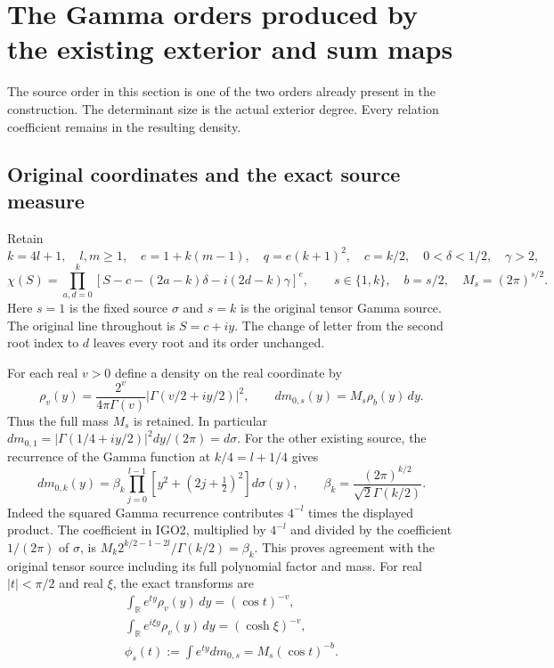 \documentclass[11pt,a4paper]{article}
\begin{document}

\clearpage

\section{The Gamma orders produced by the existing exterior and sum maps}
\label{sec:IGO}

The source order in this section is one of the two orders already present
in the construction. The determinant size is the actual exterior degree.
Every relation coefficient remains in the resulting density.

\subsection{Original coordinates and the exact source measure}
Retain
\[
 k=4l+1,\quad l,m\geq1,\quad e=1+k(m-1),\quad
 q=e(k+1)^2,\quad c=k/2,\quad
 0<\delta<1/2,\quad\gamma>2,
\]
\[
 \chi(S)=\prod_{a,d=0}^{k}
 [S-c-(2a-k)\delta-i(2d-k)\gamma]^e,
 \qquad s\in\{1,k\},\quad b=s/2,\quad M_s=(2\pi)^{s/2}.
 \tag{IGO1}
\]
Here $s=1$ is the fixed source $\sigma$ and $s=k$ is the original
tensor Gamma source. The original line throughout is $S=c+iy$.
The change of letter from the second root index to $d$ leaves every
root and its order unchanged.

For each real $v>0$ define a density on the real coordinate by
\[
 \rho_v(y)=\frac{2^v}{4\pi\Gamma(v)}
       \left|\Gamma(v/2+iy/2)\right|^2,
 \qquad dm_{0,s}(y)=M_s\rho_b(y)\,dy.
 \tag{IGO2}
\]
Thus the full mass $M_s$ is retained. In particular
$dm_{0,1}=|\Gamma(1/4+iy/2)|^2dy/(2\pi)=d\sigma$.
For the other existing source, the recurrence of the Gamma function
at $k/4=l+1/4$ gives
\[
 dm_{0,k}(y)=\beta_k\prod_{j=0}^{l-1}
           [y^2+(2j+\tfrac12)^2]d\sigma(y),\qquad
 \beta_k=\frac{(2\pi)^{k/2}}{\sqrt2\Gamma(k/2)}.
\]
Indeed the squared Gamma recurrence contributes $4^{-l}$ times
the displayed product. The coefficient in IGO2, multiplied by
$4^{-l}$ and divided by the coefficient $1/(2\pi)$ of $\sigma$,
is $M_k2^{k/2-1-2l}/\Gamma(k/2)=\beta_k$.
This proves agreement with the original tensor source including
its full polynomial factor and mass.
For real $|t|<\pi/2$ and real $\xi$, the exact transforms are
\[
 \begin{gathered}
 \int_{\mathbb R}e^{ty}\rho_v(y)\,dy=(\cos t)^{-v},\\
 \int_{\mathbb R}e^{i\xi y}\rho_v(y)\,dy=(\cosh\xi)^{-v},
 \\ \phi_s(t):=\int e^{ty}dm_{0,s}=M_s(\cos t)^{-b}.
 \end{gathered}
 \tag{IGO3}
\]
\end{document}
